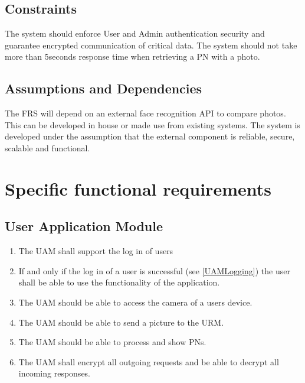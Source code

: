 \documentclass[a4paper,11pt]{article}
\begin{document}
\subsection{Constraints}
The system should enforce User and Admin authentication security and guarantee encrypted communication of critical data.
The system should not take more than 5seconds response time when retrieving a PN with a photo.

\subsection{Assumptions and Dependencies}
The FRS will depend on an external face recognition API to compare photos. This can be developed in house or made use from existing systems. The system is developed under the assumption that the external component is reliable, secure, scalable and functional.

\newpage
\section{Specific functional requirements}

\subsection{User Application Module}
\begin{enumerate}[leftmargin=0.8in]
		\item \label{UAMLogging} The UAM shall support the log in of users
    \item If and only if the log in of a user is successful (see \ref{UAMLogging}) the user shall be able to use the functionality of the application.
		\item \label{UAMCAM} The UAM should be able to access the camera of a users device.
    \item \label{UAMCAM} The UAM should be able to send a picture to the URM.
    \item \label{UAMRet} The UAM should be able to process and show PNs.
		\item The UAM shall encrypt all outgoing requests and be able to decrypt all incoming responses.
\end{enumerate}
\end{document}
